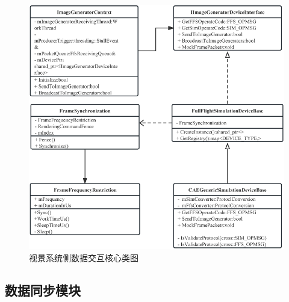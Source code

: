 \begin{figure}[h!]
    \begin{center}
        \includegraphics[width=\textwidth]{pictures/classdiagram3.pdf}
        \caption{视景系统侧数据交互核心类图}
        \label{module32}
    \end{center}
\end{figure}
\subsection{数据同步模块}
